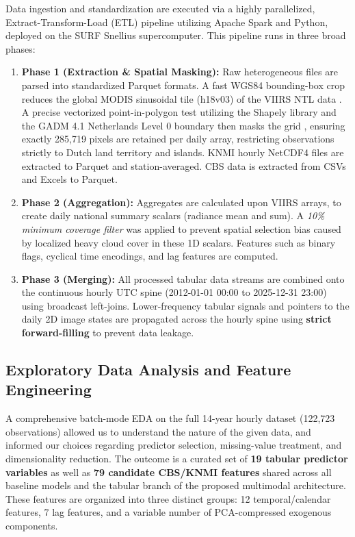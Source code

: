 Data ingestion and standardization are executed via a highly parallelized, Extract-Transform-Load (ETL) pipeline utilizing Apache Spark and Python, deployed on the SURF Snellius supercomputer. This pipeline runs in three broad phases:

\begin{enumerate}
    \item \textbf{Phase 1 (Extraction \& Spatial Masking):} Raw heterogeneous files are parsed into standardized Parquet formats. A fast WGS84 bounding-box crop reduces the global MODIS sinusoidal tile (h18v03) of the VIIRS NTL data \cite{nasa_viirs_vnp46a2}. A precise vectorized point-in-polygon test utilizing the Shapely library and the GADM 4.1 Netherlands Level 0 boundary then masks the grid \cite{gadm2024}, ensuring exactly 285,719 pixels are retained per daily array, restricting observations strictly to Dutch land territory and islands. KNMI hourly NetCDF4 files are extracted to Parquet and station-averaged. CBS data is extracted from CSVs and Excels to Parquet.
    \item \textbf{Phase 2 (Aggregation):} Aggregates are calculated upon VIIRS arrays, to create daily national summary scalars (radiance mean and sum). A \textit{10\% minimum coverage filter} was applied to prevent spatial selection bias caused by localized heavy cloud cover in these 1D scalars.  Features such as binary flags, cyclical time encodings, and lag features are computed.
    \item \textbf{Phase 3 (Merging):} All processed tabular data streams are combined onto the continuous hourly UTC spine (2012-01-01 00:00 to 2025-12-31 23:00) using broadcast left-joins. Lower-frequency tabular signals and pointers to the daily 2D image states are propagated across the hourly spine using \textbf{strict forward-filling} to prevent data leakage.
\end{enumerate}


\subsection{Exploratory Data Analysis and Feature Engineering}
\label{subsec:eda_feature_engineering}

A comprehensive batch-mode EDA on the full 14-year hourly dataset (122,723 observations) allowed us to understand the nature of the given data, and informed our choices regarding predictor selection, missing-value treatment, and dimensionality reduction. The outcome is a curated set of \textbf{19 tabular predictor variables} as well as \textbf{79 candidate CBS/KNMI features} shared across all baseline models and the tabular branch of the proposed multimodal architecture. These features are organized into three distinct groups: 12 temporal/calendar features, 7 lag features, and a variable number of PCA-compressed exogenous components.

